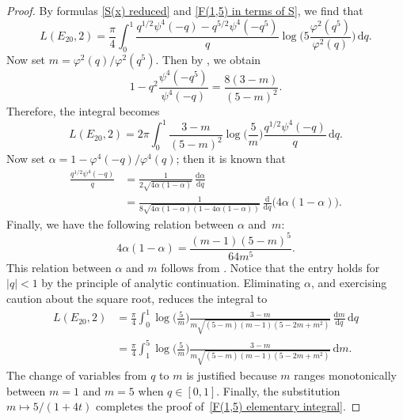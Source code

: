\documentclass[12pt,reqno]{amsart}
\theoremstyle{remark}
\begin{document}
\begin{proof}
By formulas \eqref{S(x) reduced} and \eqref{F(1,5) in terms of
S}, we find that
\begin{equation*}
L(E_{20},2)=\frac{\pi}{4}\int_{0}^{1}\frac{q^{1/2}\psi^4(-q)-q^{5/2}\psi^4(-q^5)}{q}
\log\biggl(5\frac{\varphi^2(q^5)}{\varphi^2(q)}\biggr)\,{{\mathrm d}} q.
\end{equation*}
Now set $m=\varphi^2(q)/\varphi^2(q^5)$.  Then by \cite[pg.~26, formula (1.6.4)]{BA}, we obtain
\begin{equation*}
1-q^2\frac{\psi^4(-q^5)}{\psi^4(-q)}=\frac{8(3-m)}{(5-m)^2}.
\end{equation*}
Therefore, the integral becomes
\begin{equation*}
L(E_{20},2)=2\pi\int_{0}^{1}\frac{3-m}{(5-m)^2}
\log\biggl(\frac{5}{m}\biggr)\frac{q^{1/2}\psi^4(-q)}{q}\,{{\mathrm d}} q.
\end{equation*}
Now set $\alpha=1-\varphi^4(-q)/\varphi^4(q)$; then it is
known that
\begin{equation*}
\begin{split}
\frac{q^{1/2}\psi^4(-q)}{q}
&=\frac{1}{2\sqrt{4\alpha(1-\alpha)}}\,\frac{{{\mathrm d}}\alpha}{{{\mathrm d}} q}
\\
&=\frac{1}{8\sqrt{4\alpha(1-\alpha)(1-4\alpha(1-\alpha))}}\,
\frac{{\mathrm d}}{{{\mathrm d}} q}\bigl(4\alpha(1-\alpha)\bigr).
\end{split}
\end{equation*}
Finally, we have the following relation between $\alpha$ and~$m$:
\begin{equation*}
4\alpha(1-\alpha)=\frac{(m-1)(5-m)^5}{64 m^5}.
\end{equation*}
This relation between $\alpha$ and $m$ follows from
\cite[pg.~288, Entry 14]{Be3}.  Notice that the entry holds for $|q|<1$ by
the principle of analytic continuation. Eliminating $\alpha$, and
exercising caution about the square root, reduces the integral to
\begin{equation*}
\begin{split}
L(E_{20},2)
&=\frac{\pi}{4}\int_{0}^{1}\log\biggl(\frac{5}{m}\biggr)\frac{3-m}{m\sqrt{(5-m)(m-1)(5-2m+m^2)}}
\,\frac{{{\mathrm d}} m}{{{\mathrm d}} q}\,{{\mathrm d}} q
\\
&=\frac{\pi}{4}\int_{1}^{5}\log\biggl(\frac{5}{m}\biggr)\frac{3-m}{m\sqrt{(5-m)(m-1)(5-2m+m^2)}}\,{{\mathrm d}} m.
\end{split}
\end{equation*}
The change of variables from $q$ to $m$ is justified because $m$
ranges monotonically between $m=1$ and $m=5$ when $q\in[0,1]$.
Finally, the substitution $m\mapsto 5/(1+4t)$ completes the
proof of~\eqref{F(1,5) elementary integral}.
\end{proof}
\end{document}
